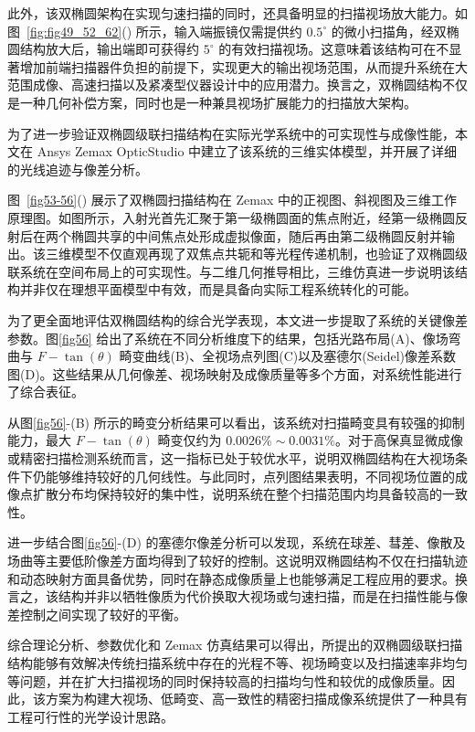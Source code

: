 此外，该双椭圆架构在实现匀速扫描的同时，还具备明显的扫描视场放大能力。如图~\ref{fig:fig49_52_62}() 所示，输入端振镜仅需提供约 $0.5^\circ$ 的微小扫描角，经双椭圆结构放大后，输出端即可获得约 $5^\circ$ 的有效扫描视场。这意味着该结构可在不显著增加前端扫描器件负担的前提下，实现更大的输出视场范围，从而提升系统在大范围成像、高速扫描以及紧凑型仪器设计中的应用潜力。换言之，双椭圆结构不仅是一种几何补偿方案，同时也是一种兼具视场扩展能力的扫描放大架构。

为了进一步验证双椭圆级联扫描结构在实际光学系统中的可实现性与成像性能，本文在 Ansys Zemax OpticStudio 中建立了该系统的三维实体模型，并开展了详细的光线追迹与像差分析。

图~\ref{fig53-56}() 展示了双椭圆扫描结构在 Zemax 中的正视图、斜视图及三维工作原理图。如图所示，入射光首先汇聚于第一级椭圆面的焦点附近，经第一级椭圆反射后在两个椭圆共享的中间焦点处形成虚拟像面，随后再由第二级椭圆反射并输出。该三维模型不仅直观再现了双焦点共轭和等光程传递机制，也验证了双椭圆级联系统在空间布局上的可实现性。与二维几何推导相比，三维仿真进一步说明该结构并非仅在理想平面模型中有效，而是具备向实际工程系统转化的可能。

为了更全面地评估双椭圆结构的综合光学表现，本文进一步提取了系统的关键像差参数。图\ref{fig56} 给出了系统在不同分析维度下的结果，包括光路布局(A)、像场弯曲与 $F-\tan(\theta)$ 畸变曲线(B)、全视场点列图(C)以及塞德尔(Seidel)像差系数图(D)。这些结果从几何像差、视场映射及成像质量等多个方面，对系统性能进行了综合表征。

从图\ref{fig56}-(B) 所示的畸变分析结果可以看出，该系统对扫描畸变具有较强的抑制能力，最大 $F-\tan(\theta)$ 畸变仅约为 $0.0026\%\sim0.0031\%$。对于高保真显微成像或精密扫描检测系统而言，这一指标已处于较优水平，说明双椭圆结构在大视场条件下仍能够维持较好的几何线性。与此同时，点列图结果表明，不同视场位置的成像点扩散分布均保持较好的集中性，说明系统在整个扫描范围内均具备较高的一致性。

进一步结合图\ref{fig56}-(D) 的塞德尔像差分析可以发现，系统在球差、彗差、像散及场曲等主要低阶像差方面均得到了较好的控制。这说明双椭圆结构不仅在扫描轨迹和动态映射方面具备优势，同时在静态成像质量上也能够满足工程应用的要求。换言之，该结构并非以牺牲像质为代价换取大视场或匀速扫描，而是在扫描性能与像差控制之间实现了较好的平衡。

综合理论分析、参数优化和 Zemax 仿真结果可以得出，所提出的双椭圆级联扫描结构能够有效解决传统扫描系统中存在的光程不等、视场畸变以及扫描速率非均匀等问题，并在扩大扫描视场的同时保持较高的扫描均匀性和较优的成像质量。因此，该方案为构建大视场、低畸变、高一致性的精密扫描成像系统提供了一种具有工程可行性的光学设计思路。

